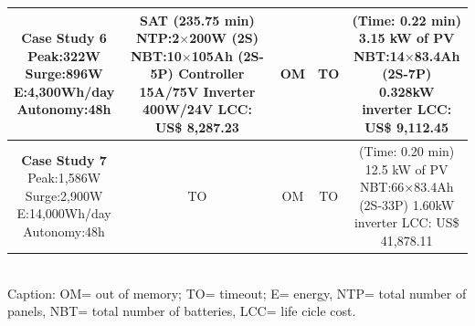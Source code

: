 \documentclass[runningheads]{llncs}
\begin{document}
\begin{table}[!t]
\begin{tabular}{|c|c|c|c|c|}
\makecell{\textbf{Case Study 6}\\Peak:322W\\Surge:896W\\E:4,300Wh/day\\Autonomy:48h} &  \makecell {SAT (235.75 min) \\NTP:2$\times$200W (2S)\\NBT:10$\times$105Ah (2S-5P)\\Controller 15A/75V\\Inverter 400W/24V \\LCC: US\$ 8,287.23} & OM & TO & \makecell{(Time: 0.22 min)\\3.15 kW of PV\\NBT:14$\times$83.4Ah (2S-7P)\\0.328kW inverter\\LCC: US\$ 9,112.45} \\
\hline
\makecell{\textbf{Case Study 7}\\Peak:1,586W\\Surge:2,900W\\E:14,000Wh/day\\Autonomy:48h} & TO & OM & TO & \makecell{(Time: 0.20 min)\\12.5 kW of PV\\NBT:66$\times$83.4Ah (2S-33P)\\1.60kW inverter\\LCC: US\$ 41,878.11} \\
\hline
\hline
\end{tabular}
\\Caption: OM= out of memory; TO= timeout; E= energy, NTP= total number of panels, NBT= total number of batteries, LCC= life cicle cost.
\end{table}
\end{document}
